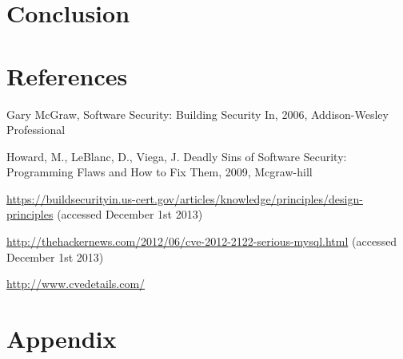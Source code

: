 \documentclass[a4paper]{article}
\begin{document}
\section{Conclusion}

\newpage
\section{References}
\begin{thebibliography}{9}
Gary McGraw,
Software Security: Building Security In,
2006,
Addison-Wesley Professional 

Howard, M., LeBlanc, D., Viega, J.
Deadly Sins of Software Security: Programming Flaws and How to Fix Them,
2009,
Mcgraw-hill

\href{https://buildsecurityin.us-cert.gov/articles/knowledge/principles/design-principles}{https://buildsecurityin.us-cert.gov/articles/knowledge/principles/design-principles} (accessed December 1st 2013)

\href{http://thehackernews.com/2012/06/cve-2012-2122-serious-mysql.html}{http://thehackernews.com/2012/06/cve-2012-2122-serious-mysql.html} 
 (accessed December 1st 2013)
 
\href{http://www.cvedetails.com/}{http://www.cvedetails.com/}
\end{thebibliography}

\newpage
\section{Appendix}
\end{document}
